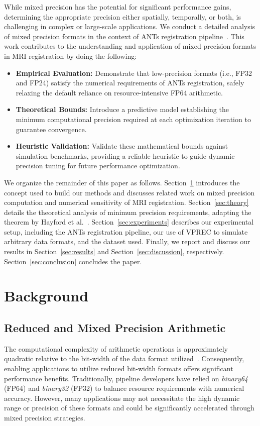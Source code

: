 \documentclass[journal,twoside,web]{ieeecolor}
\begin{document}
While mixed precision has the potential for significant performance gains, determining the appropriate precision either spatially, temporally, or both, is challenging in complex or large-scale applications. We conduct a detailed analysis of mixed precision formats in the context of ANTs registration pipeline~\cite{Avants2020-xx}. This work contributes to the understanding and application of mixed precision formats in MRI registration by doing the following:
\begin{itemize}
	\item \textbf{Empirical Evaluation:} Demonstrate that low-precision formats (i.e., FP32 and FP24) satisfy the numerical requirements of ANTs registration, safely relaxing the default reliance on resource-intensive FP64 arithmetic.
	\item \textbf{Theoretical Bounds:} Introduce a predictive model establishing the minimum computational precision required at each optimization iteration to guarantee convergence.
	\item \textbf{Heuristic Validation:} Validate these mathematical bounds against simulation benchmarks, providing a reliable heuristic to guide dynamic precision tuning for future performance optimization.
\end{itemize}

We organize the remainder of this paper as follows. Section~\ref{sec:background}
introduces the concept used to build our methods and discusses related work on
mixed precision computation and numerical sensitivity of MRI registration.
Section~\ref{sec:theory} details the theoretical analysis of minimum precision
requirements, adapting the theorem by Hayford et al.~\cite{Hayford2024-kb}.
Section~\ref{sec:experiments} describes our experimental setup, including the
ANTs registration pipeline, our use of VPREC to simulate arbitrary data formats,
and the dataset used. Finally, we report and discuss our results in
Section~\ref{sec:results} and Section~\ref{sec:discussion}, respectively.
Section~\ref{sec:conclusion} concludes the paper.

\section{Background}
\label{sec:background}

\subsection{Reduced and Mixed Precision Arithmetic}
The computational complexity of arithmetic operations is approximately quadratic relative to the bit-width of the data format utilized~\cite{Wang2019-qe}. Consequently, enabling applications to utilize reduced bit-width formats offers significant performance benefits. Traditionally, pipeline developers have relied on \textit{binary64} (FP64) and \textit{binary32} (FP32) to balance resource requirements with numerical accuracy. However, many applications may not necessitate the high dynamic range or precision of these formats and could be significantly accelerated through mixed precision strategies.
\end{document}
